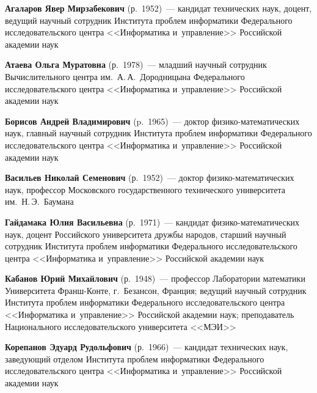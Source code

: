 \begin{multicols}{2}


\noindent
\textbf{Агаларов Явер Мирзабекович} (р.\ 1952)~--- кандидат технических наук, 
доцент, ведущий научный сотрудник Института проб\-лем информатики Федерального 
 исследовательского центра <<Информатика и~управ\-ление>> Российской академии наук

\vspace*{3pt}

\noindent
\textbf{Атаева Ольга Муратовна} (р.\ 1978)~--- младший научный сотрудник 
Вычислительного центра им.\ А.\,А.~Дородницына Федерального исследовательского центра 
<<Информатика и~управ\-ле\-ние>> Российской академии наук

\vspace*{3pt}

\noindent
\textbf{Борисов Андрей Владимирович} (p.\ 1965)~---
 доктор фи\-зи\-ко-ма\-те\-ма\-ти\-че\-ских наук, 
 главный научный сотрудник Института проб\-лем информатики Федерального 
 исследовательского центра <<Информатика и~управ\-ление>> Российской академии наук
 
\vspace*{3pt}

\noindent
\textbf{Васильев Николай Семенович} (р.\ 1952)~--- доктор фи\-зи\-ко-ма\-те\-ма\-ти\-че\-ских наук, 
 профессор Московского государственного технического университета  им.\ Н.\,Э.~Баумана
 
\vspace*{3pt}

\noindent
\textbf{Гайдамака Юлия Васильевна} (р.\ 1971)~--- 
кандидат фи\-зи\-ко-ма\-те\-ма\-ти\-че\-ских наук, 
 доцент Российского университета друж\-бы народов, старший научный сотрудник 
 Института проб\-лем информатики Федерального 
 исследовательского центра <<Информатика и~управ\-ление>> Российской академии наук
 
 \vspace*{3pt}
 
\noindent
\textbf{Кабанов Юрий Михайлович} (р.\ 1948)~--- профессор Лаборатории математики 
Университета Франш-Кон\-те, г.~Безансон, Франция; 
ведущий научный сотрудник Института проб\-лем информатики Федерального 
исследовательского центра <<Информатика и~управ\-ле\-ние>> Российской академии наук;
 преподаватель Национального исследовательского университета <<МЭИ>>
 
\vspace*{3pt}

\noindent
 \textbf{Корепанов Эдуард Рудольфович} (р.\ 1966)~--- 
 кандидат технических наук, заведующий отделом Института проб\-лем информатики 
 Федерального исследовательского центра <<Информатика и~управ\-ле\-ние>> 
 Российской академии наук 
 

\end{multicols}
